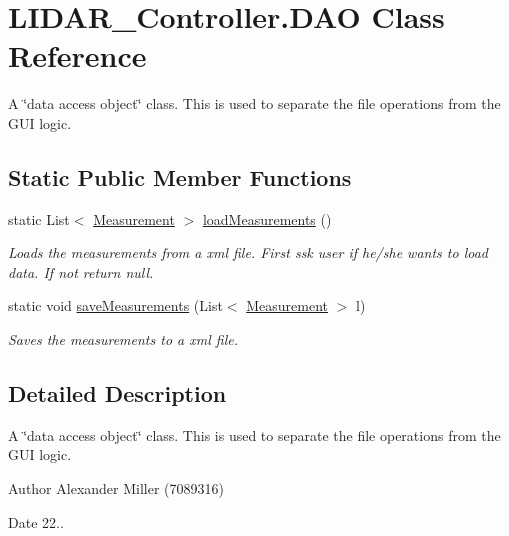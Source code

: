 \hypertarget{class_l_i_d_a_r___controller_1_1_d_a_o}{}\section{L\+I\+D\+A\+R\+\_\+\+Controller.\+D\+AO Class Reference}
\label{class_l_i_d_a_r___controller_1_1_d_a_o}


A \char`\"{}data access object\char`\"{} class. This is used to separate the file operations from the G\+UI logic.  


\subsection*{Static Public Member Functions}
\begin{DoxyCompactItemize}
\item 
static List$<$ \hyperlink{class_l_i_d_a_r___controller_1_1_measurement}{Measurement} $>$ \hyperlink{class_l_i_d_a_r___controller_1_1_d_a_o_acfdac277f8f5c97272fafdaecf3252fb}{load\+Measurements} ()
\begin{DoxyCompactList}\small\item\em Loads the measurements from a xml file. First ssk user if he/she wants to load data. If not return null. \end{DoxyCompactList}\item 
static void \hyperlink{class_l_i_d_a_r___controller_1_1_d_a_o_a6ad2697a8c414f60b8076cfdffe433c8}{save\+Measurements} (List$<$ \hyperlink{class_l_i_d_a_r___controller_1_1_measurement}{Measurement} $>$ l)
\begin{DoxyCompactList}\small\item\em Saves the measurements to a xml file. \end{DoxyCompactList}\end{DoxyCompactItemize}


\subsection{Detailed Description}
A \char`\"{}data access object\char`\"{} class. This is used to separate the file operations from the G\+UI logic. 

\begin{DoxyAuthor}{Author}
Alexander Miller (7089316) 
\end{DoxyAuthor}
\begin{DoxyDate}{Date}
22.. 
\end{DoxyDate}


